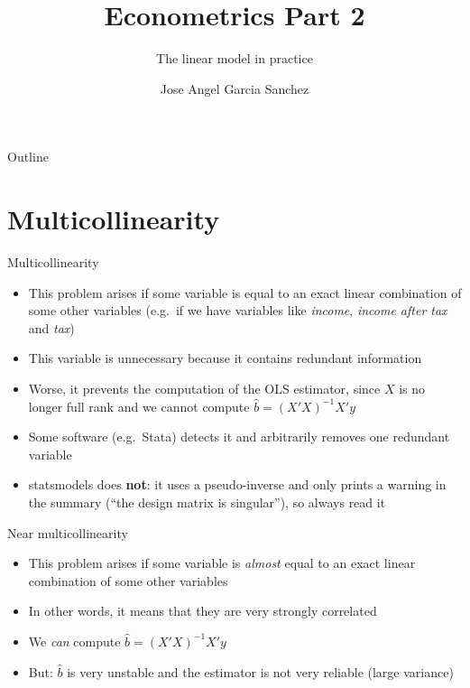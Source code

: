 \documentclass[aspectratio=169]{beamer}
\title{Econometrics Part 2}
\subtitle{The linear model in practice}
\author{Jose Angel Garcia Sanchez}
\institute{Sorbonne Data Analytics}
\date{} %
\begin{document}
{
\begin{frame}
\titlepage
\end{frame}
}

\begin{frame}{Outline}
\tableofcontents
\end{frame}

\section{Multicollinearity}

\begin{frame}{Multicollinearity}
\begin{itemize}
    \item This problem arises if some variable is equal to an exact linear combination of some other variables (e.g.\ if we have variables like \textit{income}, \textit{income after tax} and \textit{tax})
    \item This variable is unnecessary because it contains redundant information
    \item Worse, it prevents the computation of the OLS estimator, since $X$ is no longer full rank and we cannot compute $\hat{b} = (X'X)^{-1}X'y$
    \item Some software (e.g.\ Stata) detects it and arbitrarily removes one redundant variable
    \item statsmodels does \textbf{not}: it uses a pseudo-inverse and only prints a warning in the summary (``the design matrix is singular''), so always read it
\end{itemize}
\end{frame}

\begin{frame}{Near multicollinearity}
\begin{itemize}
    \item This problem arises if some variable is \textit{almost} equal to an exact linear combination of some other variables
    \item In other words, it means that they are very strongly correlated
    \item We \textit{can} compute $\hat{b} = (X'X)^{-1}X'y$
    \item But: $\hat{b}$ is very unstable and the estimator is not very reliable (large variance)
\end{itemize}
\end{frame}
\end{document}
